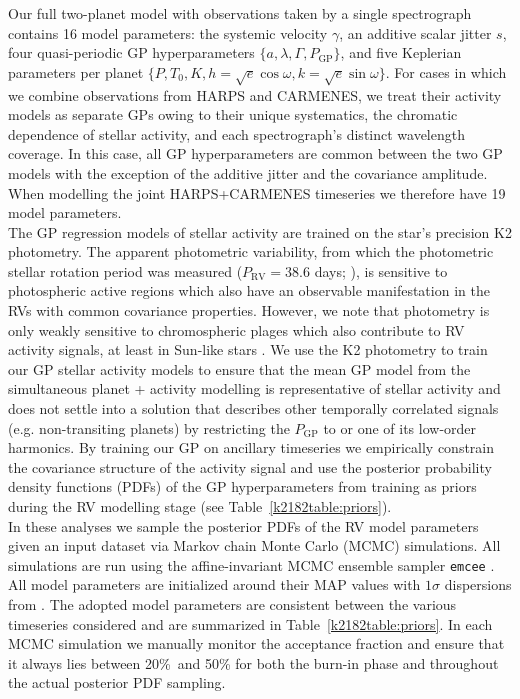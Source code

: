Our full two-planet model with observations taken by a single spectrograph contains 16 model parameters: the systemic
velocity $\gamma$, an additive scalar jitter $s$, four quasi-periodic GP hyperparameters
$\{a, \lambda, \Gamma, P_{\text{GP}}\}$, and five Keplerian parameters per planet
$\{P, T_0, K, h=\sqrt{e}\cos{\omega}, k=\sqrt{e}\sin{\omega} \}$. For cases in which we combine observations from
HARPS and CARMENES, we treat their activity models as separate GPs \citep[e.g.][]{grunblatt15}
owing to their unique systematics, the chromatic dependence of stellar activity, and each spectrograph's distinct
wavelength coverage. In this case,
all GP hyperparameters are common between the two GP models with the exception of the additive jitter and the covariance
amplitude. When modelling the joint HARPS+CARMENES timeseries we therefore have 19 model parameters. \\

The GP regression models of stellar activity are trained on the star's precision K2 photometry. The
apparent photometric variability, from which the photometric stellar rotation period was measured
($P_{\text{RV}}=38.6$ days; ), is sensitive
to photospheric active regions which also have an observable manifestation in the RVs with common covariance
properties. However, we note that photometry is only weakly sensitive to chromospheric plages which also
contribute to RV activity signals, at least in Sun-like stars \citep{haywood16}. We
use the K2 photometry to train our GP stellar activity models to ensure that the
mean GP model from the simultaneous planet + activity modelling is representative of stellar
activity and does not settle into a solution that describes other temporally correlated signals (e.g.
non-transiting planets) by restricting the $P_{\text{GP}}$ to \prot{} or one of its low-order
harmonics. By training our GP on ancillary timeseries we empirically constrain the covariance structure of the
activity signal and use the posterior probability density functions (PDFs)
of the GP hyperparameters from training as priors during
the RV modelling stage (see Table~\ref{k2182table:priors}). \\





In these analyses we sample the posterior PDFs
of the RV model parameters given an input dataset via Markov chain Monte Carlo (MCMC) simulations.
All simulations are run using the affine-invariant MCMC ensemble sampler
\texttt{emcee} \citep{foremanmackey13}. All model parameters are initialized around their MAP values
with $1\sigma$ dispersions from . The adopted model parameters are consistent
between the various timeseries considered and are summarized in Table~\ref{k2182table:priors}. In each
MCMC simulation we manually monitor the acceptance fraction and ensure that it always lies between
20\%\ and 50\% for both the burn-in phase and throughout the actual posterior PDF sampling.

